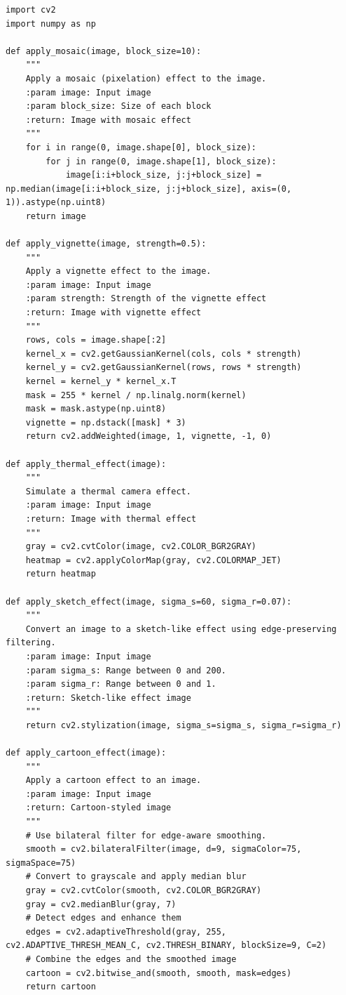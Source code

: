 \documentclass[a4paper,12pt]{article}
\begin{document}
\begin{lstlisting}[style=python]
import cv2
import numpy as np

def apply_mosaic(image, block_size=10):
    """
    Apply a mosaic (pixelation) effect to the image.
    :param image: Input image
    :param block_size: Size of each block
    :return: Image with mosaic effect
    """
    for i in range(0, image.shape[0], block_size):
        for j in range(0, image.shape[1], block_size):
            image[i:i+block_size, j:j+block_size] = np.median(image[i:i+block_size, j:j+block_size], axis=(0, 1)).astype(np.uint8)
    return image

def apply_vignette(image, strength=0.5):
    """
    Apply a vignette effect to the image.
    :param image: Input image
    :param strength: Strength of the vignette effect
    :return: Image with vignette effect
    """
    rows, cols = image.shape[:2]
    kernel_x = cv2.getGaussianKernel(cols, cols * strength)
    kernel_y = cv2.getGaussianKernel(rows, rows * strength)
    kernel = kernel_y * kernel_x.T
    mask = 255 * kernel / np.linalg.norm(kernel)
    mask = mask.astype(np.uint8)
    vignette = np.dstack([mask] * 3)
    return cv2.addWeighted(image, 1, vignette, -1, 0)

def apply_thermal_effect(image):
    """
    Simulate a thermal camera effect.
    :param image: Input image
    :return: Image with thermal effect
    """
    gray = cv2.cvtColor(image, cv2.COLOR_BGR2GRAY)
    heatmap = cv2.applyColorMap(gray, cv2.COLORMAP_JET)
    return heatmap

def apply_sketch_effect(image, sigma_s=60, sigma_r=0.07):
    """
    Convert an image to a sketch-like effect using edge-preserving filtering.
    :param image: Input image
    :param sigma_s: Range between 0 and 200.
    :param sigma_r: Range between 0 and 1.
    :return: Sketch-like effect image
    """
    return cv2.stylization(image, sigma_s=sigma_s, sigma_r=sigma_r)

def apply_cartoon_effect(image):
    """
    Apply a cartoon effect to an image.
    :param image: Input image
    :return: Cartoon-styled image
    """
    # Use bilateral filter for edge-aware smoothing.
    smooth = cv2.bilateralFilter(image, d=9, sigmaColor=75, sigmaSpace=75)
    # Convert to grayscale and apply median blur
    gray = cv2.cvtColor(smooth, cv2.COLOR_BGR2GRAY)
    gray = cv2.medianBlur(gray, 7)
    # Detect edges and enhance them
    edges = cv2.adaptiveThreshold(gray, 255, cv2.ADAPTIVE_THRESH_MEAN_C, cv2.THRESH_BINARY, blockSize=9, C=2)
    # Combine the edges and the smoothed image
    cartoon = cv2.bitwise_and(smooth, smooth, mask=edges)
    return cartoon


\end{lstlisting}
\end{document}
